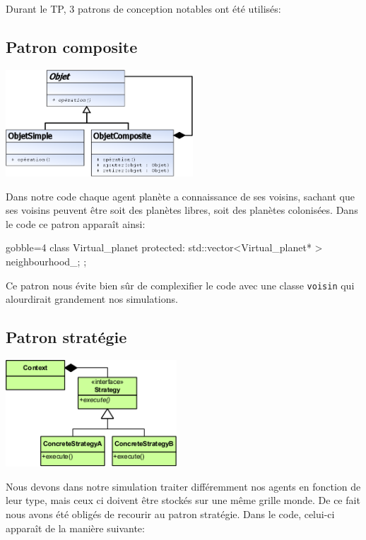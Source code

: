   Durant le TP, 3 patrons de conception notables ont été utilisés:
  
  \subsection{Patron composite}
  \begin{center}
    \includegraphics[height=4cm]{images/composite.png}
  \end{center}

  Dans notre code chaque agent planète a connaissance de ses voisins, sachant que ses voisins peuvent être soit des planètes libres, soit des planètes colonisées. Dans le code ce patron apparaît ainsi:

  \begin{cppcode*}{gobble=4}
    class Virtual_planet
    {
    protected:
      std::vector<Virtual_planet* > neighbourhood_;
    };
  \end{cppcode*}
  Ce patron nous évite bien sûr de complexifier le code avec une classe \texttt{voisin} qui alourdirait grandement nos simulations.

  \subsection{Patron stratégie}
  \begin{center}
    \includegraphics[height=4cm]{images/strategy.png}
  \end{center}

  Nous devons dans notre simulation traiter différemment nos agents en fonction de leur type, mais ceux ci doivent être stockés sur une même grille monde. De ce fait nous avons été obligés de recourir au patron stratégie. Dans le code, celui-ci apparaît de la manière suivante:

